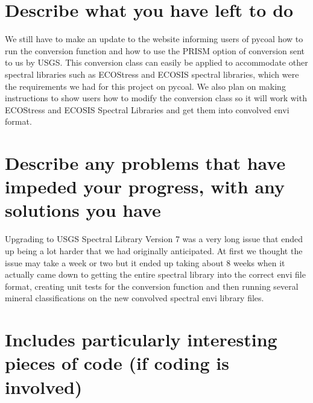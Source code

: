 \documentclass[onecolumn, draftclsnofoot,10pt, compsoc]{IEEEtran}
\begin{document}
\section{Describe what you have left to do}

We still have to make an update to the website informing users of pycoal how to run the conversion function and how to use the PRISM option of conversion sent to us by USGS. This conversion class can easily be applied to accommodate other spectral libraries such as ECOStress and ECOSIS spectral libraries, which were the requirements we had for this project on pycoal. \newline \newline
We also plan on making instructions to show users how to modify the conversion class so it will work with ECOStress and ECOSIS Spectral Libraries and get them into convolved envi format.

\section{Describe any problems that have impeded your progress, with any solutions you have}

Upgrading to USGS Spectral Library Version 7 was a very long issue that ended up being a lot harder that we had originally anticipated. At first we thought the issue may take a week or two but it ended up taking about 8 weeks when it actually came down to getting the entire spectral library into the correct envi file format, creating unit tests for the conversion function and then running several mineral classifications on the new convolved spectral envi library files. 

\section{Includes particularly interesting pieces of code (if coding is involved)}
\end{document}

